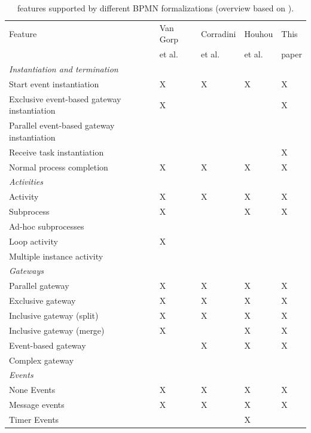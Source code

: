 \documentclass[runningheads]{llncs}
\begin{document}
\begin{table}[htbp]
    \caption{features supported by different BPMN formalizations (overview based on \cite{vangorpVisualTokenbasedFormalization2013}).}
    \label{tab:supportedfeatures}
    \begin{threeparttable}
    \begin{tabular}{l l l l l}
    \hline
      Feature & Van Gorp &  Corradini & Houhou & This\\
      & et al. \cite{vangorpVisualTokenbasedFormalization2013} & et al. \cite{corradiniFormalApproachAnalysis2021}& et al. \cite{houhouFirstOrderLogicVerification2022} & paper\\
      \hline
      \textit{Instantiation and termination} & &\\
      Start event instantiation & X & X & X & X\\
      Exclusive event-based gateway instantiation & X & & & X\\
      Parallel event-based gateway instantiation &  & & & \\
      Receive task instantiation & & & & X\\
      Normal process completion & X & X & X & X\\
      \textit{Activities} & & & &\\
      Activity & X & X & X & X\\
      Subprocess & X & & X & X\\
      Ad-hoc subprocesses & & & &\\
      Loop activity & X & & &\\
      Multiple instance activity & & & & \\
      \textit{Gateways} & & & &\\
      Parallel gateway & X & X & X & X\\
      Exclusive gateway & X & X & X & X\\
      Inclusive gateway (split) & X & X & X & X\\
      Inclusive gateway (merge) & X & & X & X\\
      Event-based gateway &  & X\tnote{1} & X & X\\ %
      Complex gateway & & & &\\
      \textit{Events} & & & & \\
      None Events & X & X & X & X\\
      Message events & X & X & X & X\\
      Timer Events & & & X & \\

\end{tabular}
\end{threeparttable}
\end{table}
\end{document}
